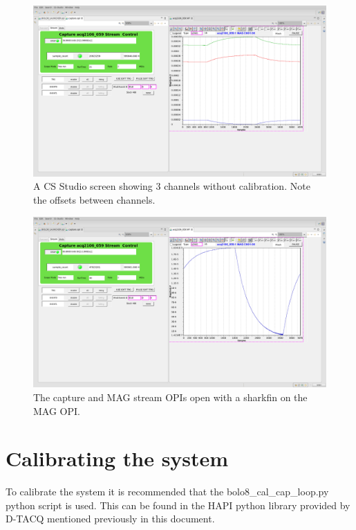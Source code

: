 \documentclass{article}
\begin{document}
\begin{figure} [hbt!]
	\centering
	\includegraphics[width=5.0in]{images/3-fin-no-cal.png}
	\caption{A CS Studio screen showing 3 channels without calibration. Note the offsets between channels.}
	\label{bolocss3finnocal}
\end{figure}

\begin{figure} [hbt!]
	\centering
	\includegraphics[width=5.0in]{images/1-fin-no-cal.png}
	\caption{The capture and MAG stream OPIs open with a sharkfin on the MAG OPI.}
	\label{bolocsscapture}
\end{figure}

\newpage

\section{Calibrating the system} \label{calibrating}
To calibrate the system it is recommended that the bolo8\_cal\_cap\_loop.py python script is used.
This can be found in the HAPI python library provided by \mbox{D-TACQ} mentioned previously in this document.
\end{document}
